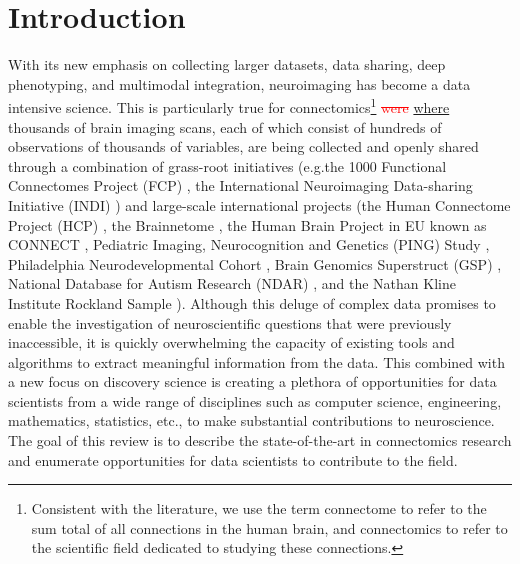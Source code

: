 \documentclass{bmcart}
\newcommand{\ADDED}[1]{\textcolor{markercolor}{\uline{#1}}}
\newcommand{\DELETED}[1]{\textcolor{red}{\sout{#1}}}
\def\marker{%
    \vadjust{{%
	\llap{\smash{%
	    \color{purple}%
	    \scalebox{1.8}{$\filledmedtriangleright$}}\;}%
    }}\hspace*{-.1ex}%
}%
\begin{document}
\begin{frontmatter}
\begin{abstractbox}
\begin{keyword}
\end{keyword}


\end{abstractbox}
%

\end{frontmatter}

\section{Introduction}

With its new emphasis on collecting larger datasets, data sharing, deep phenotyping, and multimodal integration, neuroimaging has become a data intensive science. This is particularly true for \marker{connectomics}\footnote{Consistent with the literature, we use the term connectome to refer to the sum total of all connections in the human brain, and connectomics to refer to the scientific field dedicated to studying these connections.} \DELETED{were} \ADDED{where} thousands of brain imaging scans, each of which consist of hundreds of observations of thousands of variables, are being collected and openly shared through a combination of grass-root initiatives (e.g.the 1000 Functional Connectomes Project (FCP) \cite{Biswal2010}, the International Neuroimaging Data-sharing Initiative (INDI) \cite{Mennes2013}) and large-scale international projects (the Human Connectome Project (HCP) \cite{RosenHCP2010,VanEssen2012}, the Brainnetome \cite{Jiang2013}, the Human Brain Project in EU known as CONNECT \cite{Assaf2013}, Pediatric Imaging, Neurocognition and Genetics (PING) Study \cite{JerniganPING}, Philadelphia Neurodevelopmental Cohort \cite{Satterthwaite2014},  Brain Genomics Superstruct (GSP) \cite{BucknerGSP2014}, National Database for Autism Research (NDAR) \cite{NDAR}, and the Nathan Kline Institute Rockland Sample \cite{Nooner2012}). Although this deluge of complex data promises to enable the investigation of neuroscientific questions that were previously inaccessible, it is quickly overwhelming the capacity of existing tools and algorithms to extract meaningful information from the data. This combined with a new focus on discovery science is creating a plethora of opportunities for data scientists from a wide range of disciplines such as computer science, engineering, mathematics, statistics, etc., to make substantial contributions to neuroscience. The goal of this review is to describe the state-of-the-art in connectomics research and enumerate opportunities for data scientists to contribute to the field.
\end{document}
